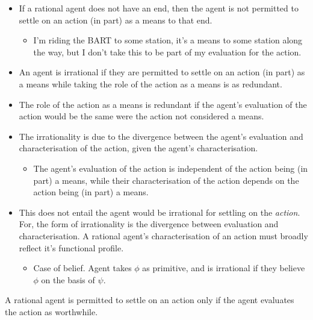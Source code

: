 \documentclass[10pt]{article}
\newcommand{\hozlinedash}[0]{%
  \noindent\hdashrule[0.5ex][c]{\textwidth}{.1pt}{2.5pt}
}
\begin{document}
\hozlinedash

\begin{itemize}
\item {\color{red} If a rational agent does not have an end, then the agent is not permitted to settle on an action (in part) as a means to that end.}
  \begin{itemize}
  \item I'm riding the BART to some station, it's a means to some station along the way, but I don't take this to be part of my evaluation for the action.
  \end{itemize}
\item An agent is irrational if they are permitted to settle on an action (in part) as a means while taking the role of the action as a means is as redundant.
\item The role of the action as a means is redundant if the agent's evaluation of the action would be the same were the action not considered a means.
\item The irrationality is due to the divergence between the agent's evaluation and characterisation of the action, given the agent's characterisation.
  \begin{itemize}
  \item The agent's evaluation of the action is independent of the action being (in part) a means, while their characterisation of the action depends on the action being (in part) a means.
  \end{itemize}
\item This does not entail the agent would be irrational for settling on the \emph{action}.
  For, the form of irrationality is the divergence between evaluation and characterisation.
  A rational agent's characterisation of an action must broadly reflect it's functional profile.
  \begin{itemize}
  \item Case of belief.
    Agent takes \(\phi\) as primitive, and is irrational if they believe \(\phi\) on the basis of \(\psi\).
  \end{itemize}
\end{itemize}


\hozlinedash

\begin{principle}\label{principle:settling-strong}
  A rational agent is permitted to settle on an action only if the agent evaluates the action as worthwhile.
\end{principle}
\end{document}
